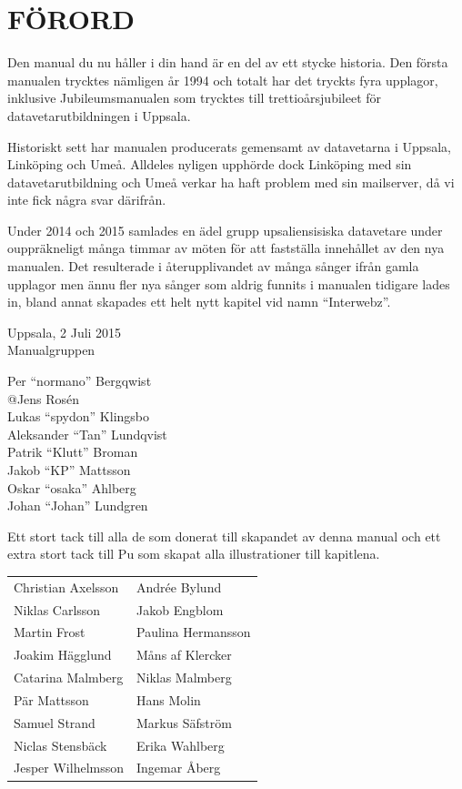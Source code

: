 \documentclass[a6paper,fontsize=10pt,twoside,open=right]{scrbook}
\begin{document}
\section{FÖRORD}
\vspace{10pt}
Den manual du nu håller i din hand är en del av ett stycke
historia. Den första manualen trycktes nämligen år 1994 och totalt har
det tryckts fyra upplagor, inklusive Jubileumsmanualen som trycktes
till trettioårsjubileet för datavetarutbildningen i Uppsala.

Historiskt sett har manualen producerats gemensamt av datavetarna i
Uppsala, Linköping och Umeå. Alldeles nyligen upphörde dock Linköping
med sin datavetarutbildning och Umeå verkar ha haft problem med sin
mailserver, då vi inte fick några svar därifrån.

Under 2014 och 2015 samlades en ädel grupp upsaliensisiska datavetare
under ouppräkneligt många timmar av möten för att fastställa
innehållet av den nya manualen. Det resulterade i återupplivandet av
många sånger ifrån gamla upplagor men ännu fler nya sånger som aldrig
funnits i manualen tidigare lades in, bland annat skapades ett helt
nytt kapitel vid namn ``Interwebz''.\par
\vspace{10pt}
\noindent Uppsala, 2 Juli 2015\\
Manualgruppen\\
\begin{center}
  \parbox{0.47\textwidth}{
    \vspace*{-7pt}
    Per ``normano'' Bergqwist\\
    {@}Jens Rosén\\
    Lukas ``spydon'' Klingsbo\\
    Aleksander ``Tan'' Lundqvist\\
    Patrik ``Klutt'' Broman\\
    Jakob ``KP'' Mattsson\\
    Oskar ``osaka'' Ahlberg\\
    Johan ``Johan'' Lundgren}
\end{center}
\null
\vspace*{-10pt}
\newpage
Ett stort tack till alla de som donerat till skapandet av denna manual
och ett extra stort tack till Pu som skapat alla illustrationer till
kapitlena.\par
\vspace{10pt}
\begin{tabular}{@{}p{}p{}@{}}
  Christian Axelsson & Andrée Bylund\\
  Niklas Carlsson & Jakob Engblom\\
  Martin Frost & Paulina Hermansson\\
  Joakim Hägglund & Måns af Klercker\\
  Catarina Malmberg & Niklas Malmberg\\
  Pär Mattsson & Hans Molin\\
  Samuel Strand & Markus Säfström\\
  Niclas Stensbäck & Erika Wahlberg\\
  Jesper Wilhelmsson & Ingemar {\fontsize{9pt}{0pt}\selectfont Å}berg
\end{tabular}\par
\end{document}
